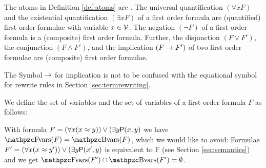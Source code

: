 
\begin{definition}\label{def:syntax:FOF}
	The atoms in Definition \vref{def:atoms} are .
	The universal quantification \( (\forall x F) \)
	and the existential quantification \( (\exists x F) \)
	of a first order formula are (quantified) first order formulae
	with  variable \( x\in\mathcal{V} \).
	The negation \( (\lnot F) \) of a first order formula
	is a (composite) first order formula.
	Further, the disjunction \( (F \lor F') \),
	the conjunction \( (F \land F')  \),
	and the implication \( (F \rightarrow F') \)
	of two first order formulae
	are (composite) first order formulae.
\end{definition}

\begin{remark}
	The Symbol \( \rightarrow \) for implication is not to be confused
	with the equational symbol for rewrite rules in Section \ref{sec:termrewriting}.
\end{remark}

\begin{definition}\label{def:fof:fvars}\label{def:fof:bvars}
	We define the set of  variables and the set of  variables
	of a first order formula \( F \) as follows:
\end{definition}

\begin{example}
	With formula \( F = (\forall x (x\approx y)) \lor (\exists y \mathsf{P}(x,y) \)
	we have \( \fvar(F) = \bvar(F) \), which we would like to avoid:
	Formulae
	\( F' = (\forall x (x\approx y')) \lor (\exists y \mathsf{P}(x',y) \)
	is equivalent to F (see Section \vref{sec:semantics})
	and we get
	\( \fvar(F') \cap \bvar(F') = \emptyset \).
\end{example}

